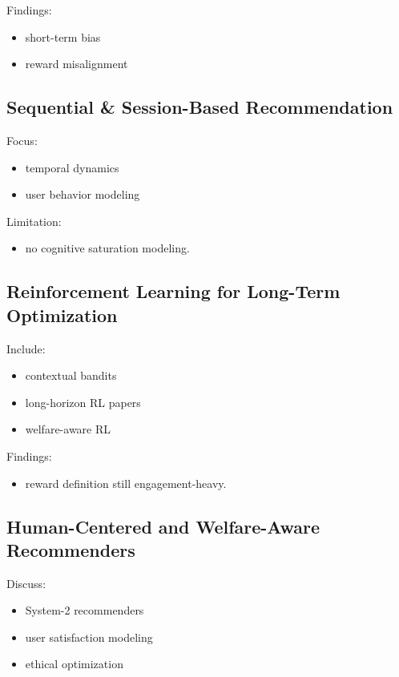 \documentclass[lettersize,journal]{IEEEtran}
\begin{document}
Findings:

\begin{itemize}
    \item short-term bias
    \item reward misalignment
\end{itemize}
    
\subsection{Sequential \& Session-Based Recommendation}

Focus:

\begin{itemize}
    \item temporal dynamics    
    \item user behavior modeling
\end{itemize}   

Limitation:

\begin{itemize}
    \item no cognitive saturation modeling.
\end{itemize}

\subsection{Reinforcement Learning for Long-Term Optimization}

Include:

\begin{itemize}
    \item contextual bandits    
    \item long-horizon RL papers
    \item welfare-aware RL
\end{itemize}
    
Findings:

\begin{itemize}
    \item reward definition still engagement-heavy.
\end{itemize}
    
\subsection{Human-Centered and Welfare-Aware Recommenders}

Discuss:

\begin{itemize}
    \item System-2 recommenders
    \item user satisfaction modeling
    \item ethical optimization
\end{itemize}
    
\end{document}
